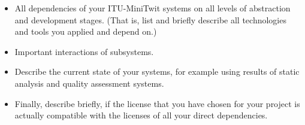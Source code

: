 \begin{itemize}
  \item All dependencies of your ITU-MiniTwit systems on all levels of abstraction and development stages. (That is, list and briefly describe all technologies and tools you applied and depend on.)
  \item Important interactions of subsystems.
  \item Describe the current state of your systems, for example using results of static analysis and quality assessment systems.
  \item Finally, describe briefly, if the license that you have chosen for your project is actually compatible with the licenses of all your direct dependencies.
  
\end{itemize}